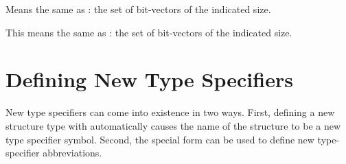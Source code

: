 \begin{flushdesc}
\item[\cd{(bit-vector {\it size})}]
Means the same as :
the set of bit-vectors of the indicated size.

\item[\cd{(simple-bit-vector {\it size})}]
This means the same as
: the set of bit-vectors of
the indicated size.
\end{flushdesc}

\section{Defining New Type Specifiers}

New type specifiers can come into existence in two ways.
First, defining a new structure type with  automatically
causes the name of the structure to be a new type specifier symbol.
Second, the  special form can be used to define new type-specifier
abbreviations.


